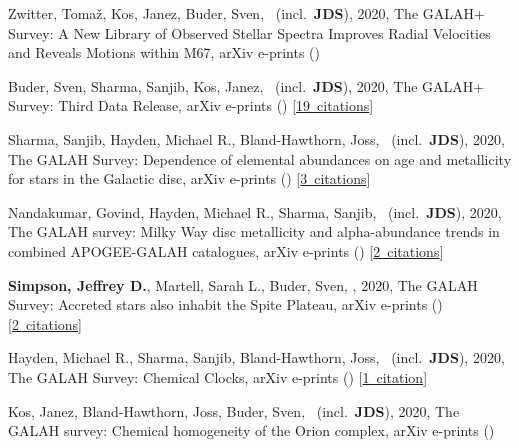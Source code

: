 \item[{\color{numcolor}\scriptsize12}] Zwitter, Toma{\v{z}}, Kos, Janez, Buder, Sven, \etal\ (incl.\ \textbf{JDS}), 2020, The GALAH+ Survey: A New Library of Observed Stellar Spectra Improves Radial Velocities and Reveals Motions within M67, arXiv e-prints ()

\item[{\color{numcolor}\scriptsize11}] Buder, Sven, Sharma, Sanjib, Kos, Janez, \etal\ (incl.\ \textbf{JDS}), 2020, The GALAH+ Survey: Third Data Release, arXiv e-prints () [\href{https://ui.adsabs.harvard.edu/#abs/2020arXiv201102505B}{19~citations}]

\item[{\color{numcolor}\scriptsize10}] Sharma, Sanjib, Hayden, Michael R., Bland-Hawthorn, Joss, \etal\ (incl.\ \textbf{JDS}), 2020, The GALAH Survey: Dependence of elemental abundances on age and metallicity for stars in the Galactic disc, arXiv e-prints () [\href{https://ui.adsabs.harvard.edu/#abs/2020arXiv201113818S}{3~citations}]

\item[{\color{numcolor}\scriptsize9}] Nandakumar, Govind, Hayden, Michael R., Sharma, Sanjib, \etal\ (incl.\ \textbf{JDS}), 2020, The GALAH survey: Milky Way disc metallicity and alpha-abundance trends in combined APOGEE-GALAH catalogues, arXiv e-prints () [\href{https://ui.adsabs.harvard.edu/#abs/2020arXiv201102783N}{2~citations}]

\item[{\color{numcolor}\scriptsize8}] \textbf{Simpson, Jeffrey D.}, Martell, Sarah L., Buder, Sven, \etal, 2020, The GALAH Survey: Accreted stars also inhabit the Spite Plateau, arXiv e-prints () [\href{https://ui.adsabs.harvard.edu/#abs/2020arXiv201102659S}{2~citations}]

\item[{\color{numcolor}\scriptsize7}] Hayden, Michael R., Sharma, Sanjib, Bland-Hawthorn, Joss, \etal\ (incl.\ \textbf{JDS}), 2020, The GALAH Survey: Chemical Clocks, arXiv e-prints () [\href{https://ui.adsabs.harvard.edu/#abs/2020arXiv201113745H}{1~citation}]

\item[{\color{numcolor}\scriptsize6}] Kos, Janez, Bland-Hawthorn, Joss, Buder, Sven, \etal\ (incl.\ \textbf{JDS}), 2020, The GALAH survey: Chemical homogeneity of the Orion complex, arXiv e-prints ()

